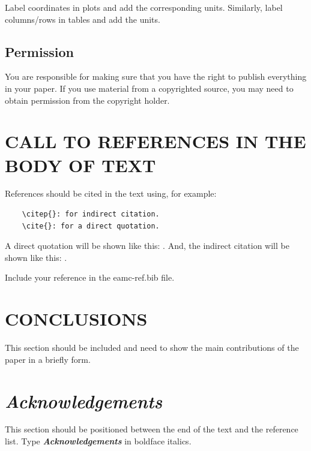 \documentclass{eamc-class}
\begin{document}
Label coordinates in plots and add the corresponding units. Similarly, label columns/rows in tables and add the units.

\subsection{Permission}
You are responsible for making sure that you have the right to publish everything in your paper. If you use material from a copyrighted source, you may need to obtain permission from the copyright holder.

\section{CALL TO REFERENCES IN THE BODY OF TEXT}
References should be cited in the text using, for example: 
\begin{verbatim}
    \citep{}: for indirect citation.
    \cite{}: for a direct quotation.
\end{verbatim}

A direct quotation will be shown like this: \citep{ArslanHansen1996}. And, the indirect citation will be shown like this: \cite{ArslanHansen1996}.

Include your reference in the eamc-ref.bib file.
    
\section{CONCLUSIONS}
This section should be included and need to show the main contributions of the paper in a briefly form.


\section{\textit{Acknowledgements}}
This section should be positioned between the end of the text and the reference list. Type \textbf{\textit{Acknowledgements}} in boldface italics.


\end{document}
